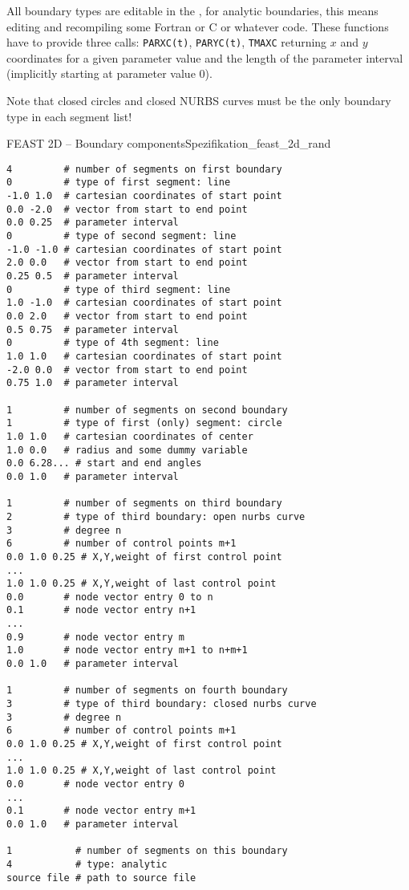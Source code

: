All boundary types are editable in the \devisor, for analytic boundaries, this
means editing and recompiling some Fortran or C or whatever code. These
functions have to provide three calls: \texttt{PARXC(t)}, \texttt{PARYC(t)},
\texttt{TMAXC} returning $x$ and $y$ coordinates for a given parameter value
and the length of the parameter interval (implicitly starting at parameter
value $0$).


Note that closed circles and closed NURBS curves must be the only boundary
type in each segment list!

\begin{code}{FEAST 2D -- Boundary components}{Spezifikation_feast_2d_rand}
\begin{verbatim}       
4         # number of segments on first boundary
0         # type of first segment: line
-1.0 1.0  # cartesian coordinates of start point
0.0 -2.0  # vector from start to end point
0.0 0.25  # parameter interval
0         # type of second segment: line
-1.0 -1.0 # cartesian coordinates of start point
2.0 0.0   # vector from start to end point
0.25 0.5  # parameter interval
0         # type of third segment: line
1.0 -1.0  # cartesian coordinates of start point
0.0 2.0   # vector from start to end point
0.5 0.75  # parameter interval
0         # type of 4th segment: line
1.0 1.0   # cartesian coordinates of start point
-2.0 0.0  # vector from start to end point
0.75 1.0  # parameter interval

1         # number of segments on second boundary
1         # type of first (only) segment: circle
1.0 1.0   # cartesian coordinates of center
1.0 0.0   # radius and some dummy variable
0.0 6.28... # start and end angles 
0.0 1.0   # parameter interval

1         # number of segments on third boundary
2         # type of third boundary: open nurbs curve
3         # degree n
6         # number of control points m+1
0.0 1.0 0.25 # X,Y,weight of first control point
...
1.0 1.0 0.25 # X,Y,weight of last control point
0.0       # node vector entry 0 to n
0.1       # node vector entry n+1
...       
0.9       # node vector entry m
1.0       # node vector entry m+1 to n+m+1
0.0 1.0   # parameter interval

1         # number of segments on fourth boundary
3         # type of third boundary: closed nurbs curve
3         # degree n
6         # number of control points m+1
0.0 1.0 0.25 # X,Y,weight of first control point
...
1.0 1.0 0.25 # X,Y,weight of last control point
0.0       # node vector entry 0
...
0.1       # node vector entry m+1
0.0 1.0   # parameter interval

1           # number of segments on this boundary
4           # type: analytic
source file # path to source file
\end{verbatim}
\end{code}





